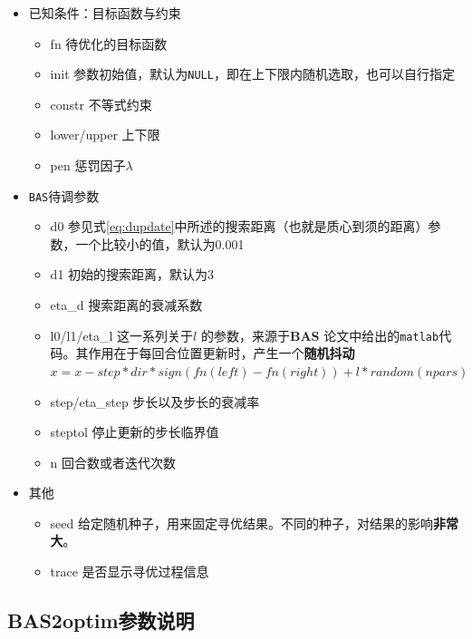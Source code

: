 \documentclass[]{ctexbook}
\providecommand{\tightlist}{%
  \setlength{\itemsep}{0pt}\setlength{\parskip}{0pt}}
\begin{document}
\begin{itemize}
\tightlist
\item
  已知条件：目标函数与约束

  \begin{itemize}
  \tightlist
  \item
    fn 待优化的目标函数
  \item
    init
    参数初始值，默认为\texttt{NULL}，即在上下限内随机选取，也可以自行指定
  \item
    constr 不等式约束
  \item
    lower/upper 上下限
  \item
    pen 惩罚因子\(\lambda\)
  \end{itemize}
\item
  \texttt{BAS}待调参数

  \begin{itemize}
  \tightlist
  \item
    d0
    参见式\eqref{eq:dupdate}中所述的搜索距离（也就是质心到须的距离）参数，一个比较小的值，默认为0.001
  \item
    d1 初始的搜索距离，默认为3
  \item
    eta\_d 搜索距离的衰减系数
  \item
    l0/l1/eta\_l 这一系列关于\(l\) 的参数，来源于\textbf{BAS}
    \citep{Jiang2017BAS}论文中给出的\texttt{matlab}代码。其作用在于每回合位置更新时，产生一个\textbf{随机抖动}\(x = x - step * dir * sign(fn(left) - fn(right)) + l *random(npars)\)
  \item
    step/eta\_step 步长以及步长的衰减率
  \item
    steptol 停止更新的步长临界值
  \item
    n 回合数或者迭代次数
  \end{itemize}
\item
  其他

  \begin{itemize}
  \tightlist
  \item
    seed
    给定随机种子，用来固定寻优结果。不同的种子，对结果的影响\textbf{非常大}。
  \item
    trace 是否显示寻优过程信息
  \end{itemize}
\end{itemize}

\subsection{BAS2optim参数说明}\label{BAS2parms}
\end{document}
